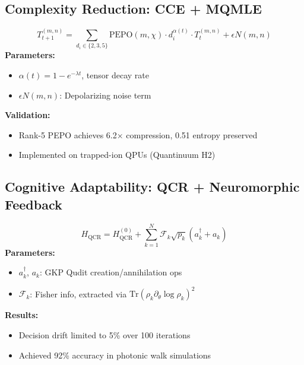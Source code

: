 \documentclass{article}
\theoremstyle{plain}
\theoremstyle{claimstyle}
\begin{document}
\subsection{Complexity Reduction: CCE + MQMLE}
\begin{equation}
T_{t+1}^{(m,n)} = \sum_{d_i \in \{2,3,5\}} \text{PEPO}(m,\chi) \cdot d_i^{\alpha(t)} \cdot T_t^{(m,n)} + \epsilon N(m,n)
\end{equation}
\textbf{Parameters:}
\begin{itemize}
  \item $\alpha(t) = 1 - e^{-\lambda t}$, tensor decay rate
  \item $\epsilon N(m,n)$: Depolarizing noise term
\end{itemize}
\textbf{Validation:}
\begin{itemize}
  \item Rank-5 PEPO achieves 6.2× compression, 0.51 entropy preserved
  \item Implemented on trapped-ion QPUs (Quantinuum H2)
\end{itemize}

\subsection{Cognitive Adaptability: QCR + Neuromorphic Feedback}
\begin{equation}
H_{\text{QCR}} = H^{(0)}_{\text{QCR}} + \sum_{k=1}^N \mathcal{F}_k \sqrt{p_k}(a_k^\dagger + a_k)
\end{equation}
\textbf{Parameters:}
\begin{itemize}
  \item $a_k^\dagger$, $a_k$: GKP Qudit creation/annihilation ops
  \item $\mathcal{F}_k$: Fisher info, extracted via $\mathrm{Tr}(\rho_k \partial_\theta \log \rho_k)^2$
\end{itemize}
\textbf{Results:}
\begin{itemize}
  \item Decision drift limited to 5\% over 100 iterations
  \item Achieved 92\% accuracy in photonic walk simulations
\end{itemize}
\end{document}
